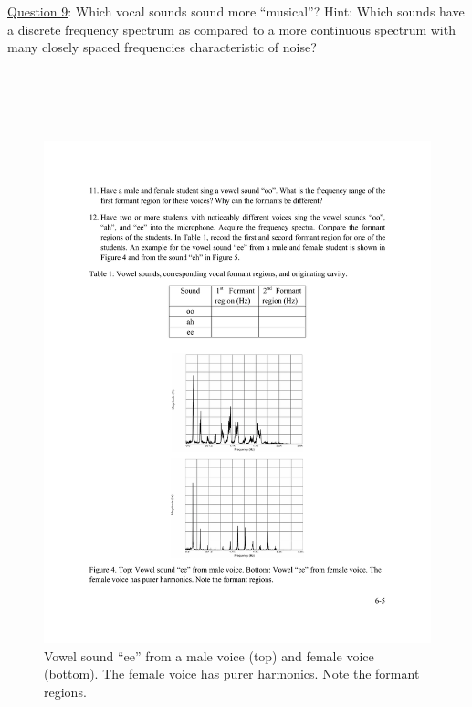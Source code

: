 \documentclass[11pt]{NSF}
\begin{document}
\underline{Question 9}: 
Which vocal sounds sound more “musical”? Hint: Which sounds have a discrete frequency
spectrum as compared to a more continuous spectrum with many closely spaced frequencies
characteristic of noise? 
\\
\\
\\
\\
\\
%
\begin{figure}[hbtp]
\begin{center}
\includegraphics[width=.6\textwidth]{fig6_4}
\caption{Vowel sound ``ee” from a male voice (top) and 
female voice (bottom). 
The female voice has purer harmonics. 
Note the formant regions.}
\label{f:4}
\end{center}
\end{figure}
\end{document}
